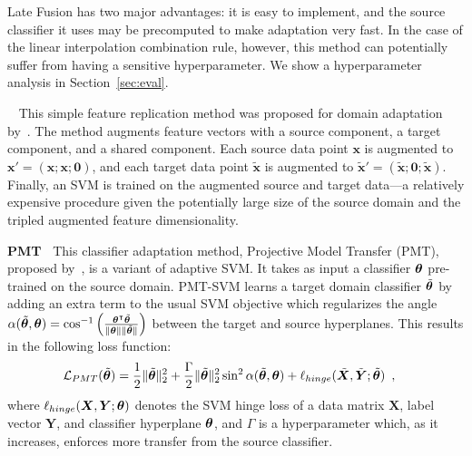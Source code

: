 Late Fusion has two major advantages: it is easy to implement, and the source classifier it uses may be precomputed to make adaptation very fast. In the case of the linear interpolation combination rule, however, this method can potentially suffer from having a sensitive hyperparameter. We show a hyperparameter analysis in Section~\ref{sec:eval}.

{\bf \daume~\cite{daume}}
This simple feature replication method was proposed for domain adaptation by~\cite{daume}.
The method augments feature vectors with a source component, a target component, and a shared component.
Each source data point $\bm{x}$ is augmented to $\bm{x}' = (\bm{x}; \bm{x}; \bm{0})$,
and each target data point $\tilde{\bm{x}}$ is augmented to $\tilde{\bm{x}}' = (\tilde{\bm{x}}; \bm{0}; \tilde{\bm{x}})$.
Finally, an SVM is trained on the augmented source and target data---a relatively expensive procedure given the potentially large size of the source domain and the tripled augmented feature dimensionality.

{\bf PMT~\cite{aytar-iccv11}} 
This classifier adaptation method, Projective Model Transfer (PMT), proposed by~\cite{aytar-iccv11}, is a variant of adaptive SVM. It takes as input a classifier $\bm{\theta}$ pre-trained on the source domain.
PMT-SVM learns a target domain classifier $\tilde{\bm{\theta}}$ by adding an extra term to the usual SVM objective which regularizes the angle
$
\alpha(\tilde{\bm{\theta}}, \bm{\theta}) =
\cos^{-1}\left(
  \frac{
    \bm{\theta}^{\intercal} \tilde{\bm{\theta}}
  }{
    \| \bm{\theta} \| \| \tilde{\bm{\theta}} \|
  }
\right)
$
between the target and source hyperplanes.
This results in the following loss function:
\begin{align}
\mathcal{L}_{PMT}(\tilde{\bm{\theta}})
&=
\frac{1}{2} \| \tilde{\bm{\theta}} \|^2_2
+
\frac{\Gamma}{2} \| \tilde{\bm{\theta}} \|^2_2 \sin^2 \alpha(\tilde{\bm{\theta}}, \bm{\theta})
+
\ell_{hinge}(\tilde{\bm{X}}, \tilde{\bm{Y}}; \tilde{\bm{\theta}})
\enspace,
\end{align}
where
$
\ell_{hinge}(\bm{X}, \bm{Y}; \bm{\theta})
$
denotes the SVM hinge loss of a data matrix
$\bm{X}$,
label vector
$\bm{Y}$,
and classifier hyperplane $\bm{\theta}$,
and $\Gamma$ is a hyperparameter which, as it increases, enforces more transfer from the source classifier.

